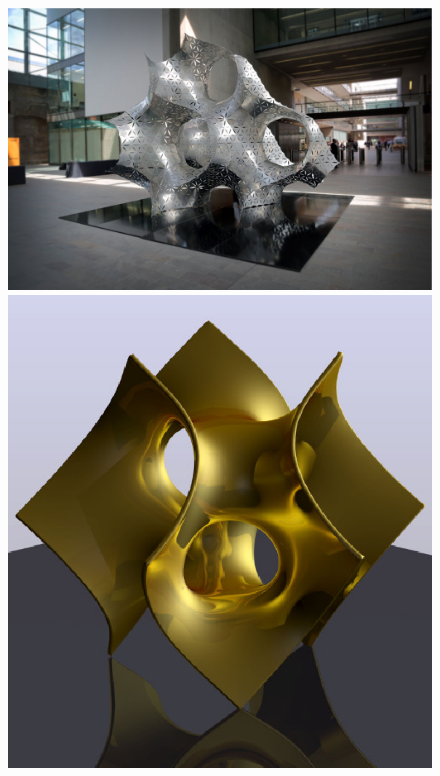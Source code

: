 \documentclass{beamer}
\begin{document}
\begin {frame}
\begin{figure}[h!]
\begin{minipage}[b]{0.50\linewidth}
   \end{minipage}
\end{figure}
\begin{figure}[h!]
   \begin{minipage}[b]{0.45\linewidth}
      \centering\includegraphics[scale=0.11]{musee.eps}
   \end{minipage}
    \begin{minipage}[b]{0.50\linewidth}   
     \centering\includegraphics[scale=0.45]{goldenbatwing.eps}
   \end{minipage}
\end{figure}
\end {frame}
\end{document}
